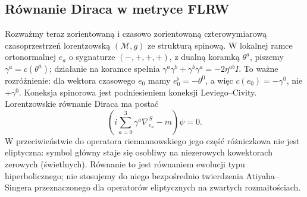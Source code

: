 \subsection{Równanie Diraca w metryce FLRW}

Rozważmy teraz zorientowaną i czasowo zorientowaną
czterowymiarową czasoprzestrzeń lorentzowską
$(\mathcal M,g)$ ze strukturą spinową. W lokalnej ramce ortonormalnej $e_a$ o sygnaturze
$(-,+,+,+)$, z dualną koramką $\theta^a$, piszemy
$\gamma^a=c(\theta^a)$; działanie na koramce spełnia
$\gamma^a\gamma^b+\gamma^b\gamma^a=-2\eta^{ab}I$.
To ważne rozróżnienie: dla wektora czasowego
$e_0$ mamy $e_0^\flat=-\theta^0$, a więc
$c(e_0)=-\gamma^0$, nie $+\gamma^0$.
Koneksja spinorowa jest podniesieniem koneksji
Leviego--Civity. Lorentzowskie równanie Diraca ma postać
\begin{equation}\label{eq:dirac-zakrzywiony}
 \left(i\sum_{a=0}^3\gamma^a\nabla^S_{e_a}-m\right)\psi=0.
\end{equation}
W przeciwieństwie do operatora riemannowskiego
jego część różniczkowa nie jest eliptyczna:
symbol główny staje się osobliwy na niezerowych
kowektorach zerowych (świetlnych). Równanie to
jest równaniem ewolucji typu hiperbolicznego;
nie stosujemy do niego bezpośrednio twierdzenia
Atiyaha--Singera przeznaczonego dla operatorów
eliptycznych na zwartych rozmaitościach.

